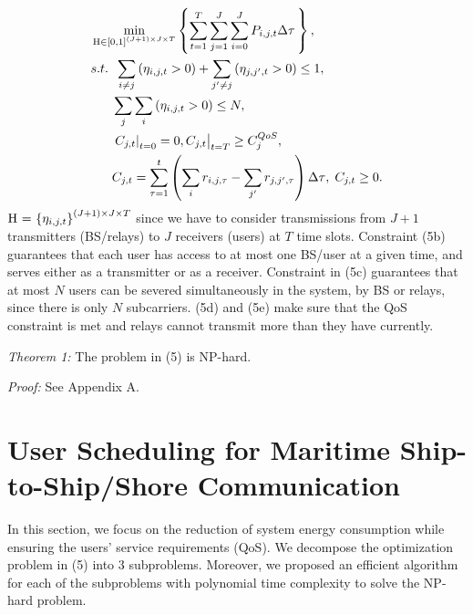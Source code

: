 \documentclass[conference]{IEEEtran}
\begin{document}
\begin{subequations}
\begin{align}
& \mathop {\min }\limits_{{\mathbf{{\rm H}}} \in {{\left[ {0,1} \right]}^{\left( {J + 1} \right) \times J \times T}}} \left\{ {\sum\limits_{t = 1}^T {\sum\limits_{j = 1}^J {\sum\limits_{i = 0}^J {{P_{i,j,t}}\Delta \tau } \,} } } \right\} ,\\
& {s.t.} \;\; \sum\limits_{i \ne j} {\left( {{\eta _{i,j,t}} > 0} \right)}  + \sum\limits_{j' \ne j} {\left( {{\eta _{j,j',t}} > 0} \right) \le {1}} ,\\
& \;\;\;\;\;\; \sum\limits_j {\sum\limits_i {\left( {{\eta _{i,j,t}} > 0} \right)} }  \le N ,\\
& \;\;\;\;\;\; {\left. {{{\left. {{C_{j,t}}} \right|}_{t = 0}} = 0, {C_{j,t}}} \right|_{t = T}} \ge C_j^{QoS}, \\
& \;\;\;\;\;\; {C_{j,t}} = \sum\limits_{\tau  = 1}^t {\left( {\sum\limits_i {{r_{i,j,\tau }}}  - \sum\limits_{j'} {{r_{j,j',\tau }}} } \right)\Delta \tau } ,\; {C_{j,t}} \ge 0.
\end{align}
\end{subequations}
${\mathbf{{\rm H}}}{\text{ = }}{\left\{ {{\eta _{i,j,t}}} \right\}^{\left( {J + 1} \right) \times J \times T}}$ since we have to consider transmissions from ${J + 1}$ transmitters (BS/relays) to $J$ receivers (users) at $T$ time slots. 
Constraint (5b) guarantees that each user has access to at most one BS/user at a given time, and serves either as a transmitter or as a receiver. Constraint in (5c) guarantees that at most $N$ users can be severed simultaneously in the system, by BS or relays, since there is only $N$ subcarriers. (5d) and (5e) make sure that the QoS constraint is met and relays cannot transmit more than they have currently.

\textit{Theorem 1:} The problem in (5) is NP-hard.

\textit{Proof:} See Appendix A. 

\section{User Scheduling for Maritime Ship-to-Ship/Shore Communication}\label{sec:3}
In this section, we focus on the reduction of system energy consumption while ensuring the users' service requirements (QoS). We decompose the optimization problem in (5) into 3 subproblems. Moreover, we proposed an efficient algorithm for each of the subproblems with polynomial time complexity to solve the NP-hard problem.
\end{document}
